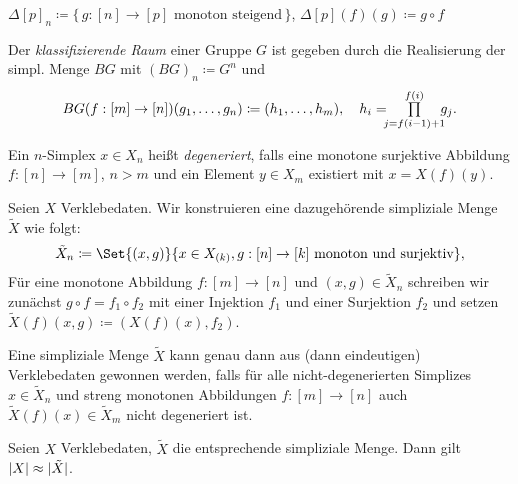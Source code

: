 \documentclass{cheat-sheet}
\newcommand{\nspace}[1]{\foreach \i in {1,...,#1}{ \! }} %
\begin{document}
\begin{defn}
  $\Delta[p]_n \coloneqq \{ \, g : [n] \to [p] \text{ monoton steigend} \, \}$, $\Delta[p](f)(g) \coloneqq g \circ f$
\end{defn}

\begin{defn}
  Der \emph{klassifizierende Raum} einer Gruppe $G$ ist gegeben durch die Realisierung der simpl. Menge $BG$ mit $(BG)_n \coloneqq G^n$ und
  \begin{align*}
    BG(f : [m] \to [n])(g_1, \ldots, g_n) \coloneqq
    (h_1, \ldots, h_m), \quad h_i = \nspace{3} \prod_{j=f(i-1)+1}^{f(i)} \nspace{3} g_j.
  \end{align*}
\end{defn}

\begin{defn}
  Ein $n$-Simplex $x \in X_n$ heißt \emph{degeneriert}, falls eine monotone surjektive Abbildung $f : [n] \to [m]$, $n > m$ und ein Element $y \in X_m$ existiert mit $x = X(f)(y)$.
\end{defn}

\begin{defn}
  Seien $X$ Verklebedaten. Wir konstruieren eine dazugehörende simpliziale Menge $\tilde{X}$ wie folgt:
  \[ \tilde{X}_n \coloneqq \Set{ (x, g) }{ x \in X_{(k)}, g : [n] \to [k] \text{ monoton und surjektiv} }, \]
  Für eine monotone Abbildung $f : [m] \to [n]$ und $(x, g) \in \tilde{X}_n$ schreiben wir zunächst $g \circ f = f_1 \circ f_2$ mit einer Injektion $f_1$ und einer Surjektion $f_2$ und setzen
  $\tilde{X}(f)(x, g) \coloneqq (X(f)(x), f_2)$.
\end{defn}

\begin{prop}
  Eine simpliziale Menge $\tilde{X}$ kann genau dann aus (dann eindeutigen) Verklebedaten gewonnen werden, falls für alle nicht-degenerierten Simplizes $x \in \tilde{X}_n$ und streng monotonen Abbildungen $f : [m] \to [n]$ auch $\tilde{X}(f)(x) \in \tilde{X}_m$ nicht degeneriert ist.
\end{prop}


\begin{prop}
  Seien $X$ Verklebedaten, $\tilde{X}$ die entsprechende simpliziale Menge. Dann gilt $\lvert X\rvert \approx \lvert\tilde{X}\rvert$.
\end{prop}
\end{document}

